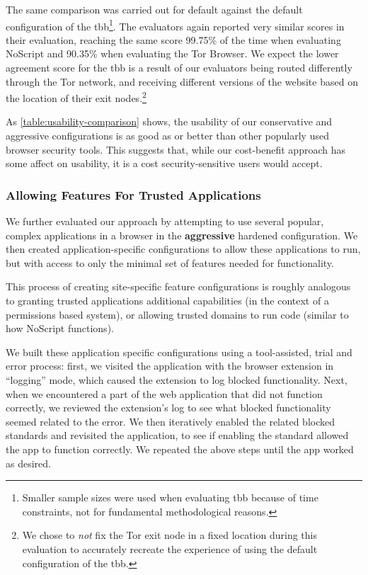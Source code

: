 The same comparison was carried out for default \FF against
the default configuration of the \gls{tbb}\footnote{Smaller sample sizes were used when evaluating \gls{tbb} because of time constraints,
not for fundamental methodological reasons.}.  The evaluators again
reported very similar scores in their evaluation, reaching the same score
99.75\% of the time when evaluating NoScript and 90.35\% when evaluating the
Tor Browser.  We expect the lower agreement score for the \gls{tbb} is
a result of our evaluators being routed differently through the Tor network, and
receiving different versions of the website based on the location of their
exit nodes.\footnote{We chose to \emph{not} fix the Tor exit node in a fixed
location during this evaluation to accurately recreate the experience of using
the default configuration of the \gls{tbb}.}

As \ref{table:usability-comparison} shows, the usability of our conservative
and aggressive configurations is as good as or better than other popularly used
browser security tools.  This suggests that, while our \WASs cost-benefit
approach has some affect on usability, it is a cost security-sensitive users
would accept.


\subsubsection{Allowing Features For Trusted Applications}
We further evaluated our approach by attempting to use several popular,
complex \JS applications in a browser in the \textbf{aggressive} hardened
configuration.  We then created application-specific configurations to allow
these applications to run, but with access to only the minimal set of
features needed for functionality.

This process of creating site-specific feature configurations
is roughly analogous to granting trusted applications additional
capabilities (in the context of a permissions based system), or allowing trusted
domains to run \JS code (similar to how NoScript functions).

We built these application specific configurations using a tool-assisted, trial
and error process: first, we visited the application with the browser extension
in ``logging'' mode, which caused the extension to log blocked functionality.
Next, when we encountered a part of the web application that did not function
correctly, we reviewed the extension's log to see what blocked functionality
seemed related to the error.  We then iteratively enabled the related blocked
standards and revisited the application, to see if enabling the standard
allowed the app to function correctly.  We repeated the above steps until the
app worked as desired.

